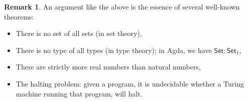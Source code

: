 \documentclass[a4paper]{article}
\newcommand{\name}[1]{\mathsf{#1}}
\theoremstyle{definition}
\newtheorem{remark}[theorem]{Remark}
\begin{document}
\begin{remark}
	An argument like the above is the essence of several well-known theorems:
	\begin{itemize}
		\item There is no set of all sets (in set theory),
		\item There is no type of all types (in type theory); in Agda, we have $\name{Set} : \name{Set}_1$,
		\item There are strictly more real numbers than natural numbers,
		\item The halting problem: given a program, it is undecidable whether a Turing machine running that program, will halt.
	\end{itemize}
\end{remark}



\end{document}
